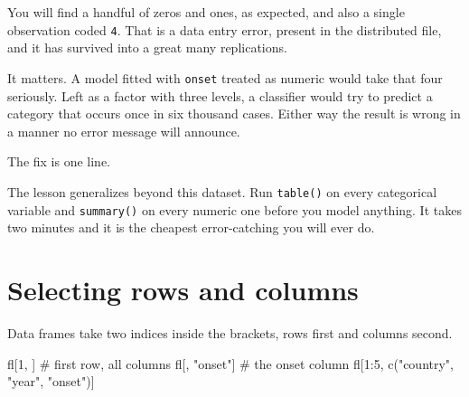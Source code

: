 \documentclass[
  a4paper,
]{scrbook}
\newenvironment{Shaded}{\begin{snugshade}}{\end{snugshade}}
\newcommand{\CommentTok}[1]{\textcolor[rgb]{0.37,0.37,0.37}{#1}}
\newcommand{\DecValTok}[1]{\textcolor[rgb]{0.68,0.00,0.00}{#1}}
\newcommand{\FunctionTok}[1]{\textcolor[rgb]{0.28,0.35,0.67}{#1}}
\newcommand{\NormalTok}[1]{\textcolor[rgb]{0.00,0.23,0.31}{#1}}
\newcommand{\OtherTok}[1]{\textcolor[rgb]{0.00,0.23,0.31}{#1}}
\newcommand{\SpecialCharTok}[1]{\textcolor[rgb]{0.37,0.37,0.37}{#1}}
\newcommand{\StringTok}[1]{\textcolor[rgb]{0.13,0.47,0.30}{#1}}
\begin{document}
\begin{Shaded}
\end{Shaded}

You will find a handful of zeros and ones, as expected, and also a
single observation coded \texttt{4}. That is a data entry error, present
in the distributed file, and it has survived into a great many
replications.

It matters. A model fitted with \texttt{onset} treated as numeric would
take that four seriously. Left as a factor with three levels, a
classifier would try to predict a category that occurs once in six
thousand cases. Either way the result is wrong in a manner no error
message will announce.

The fix is one line.

\begin{Shaded}
\end{Shaded}

The lesson generalizes beyond this dataset. Run \texttt{table()} on
every categorical variable and \texttt{summary()} on every numeric one
before you model anything. It takes two minutes and it is the cheapest
error-catching you will ever do.

\section*{Selecting rows and columns}\label{selecting-rows-and-columns}


Data frames take two indices inside the brackets, rows first and columns
second.

\begin{Shaded}
\begin{Highlighting}[]
\NormalTok{fl[}\DecValTok{1}\NormalTok{, ]            }\CommentTok{\# first row, all columns}
\NormalTok{fl[, }\StringTok{"onset"}\NormalTok{]      }\CommentTok{\# the onset column}
\NormalTok{fl[}\DecValTok{1}\SpecialCharTok{:}\DecValTok{5}\NormalTok{, }\FunctionTok{c}\NormalTok{(}\StringTok{"country"}\NormalTok{, }\StringTok{"year"}\NormalTok{, }\StringTok{"onset"}\NormalTok{)]}
\end{Highlighting}
\end{Shaded}
\end{document}

